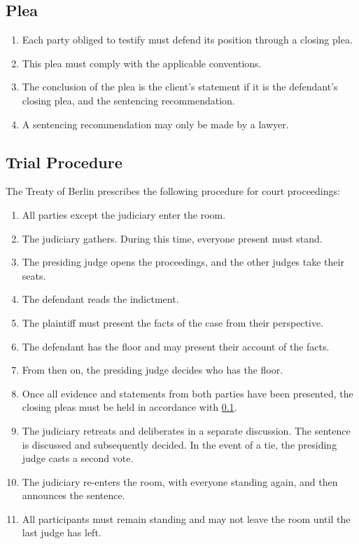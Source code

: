 \documentclass{article}
\begin{document}
\subsection{Plea}\label{pleed}
\begin{enumerate}[(1)]
    \item Each party obliged to testify must defend its position through a closing plea.
    \item This plea must comply with the applicable conventions.
    \item The conclusion of the plea is the client's statement if it is the defendant's closing plea, and the sentencing recommendation.
    \item A sentencing recommendation may only be made by a lawyer.
\end{enumerate}

\subsection{Trial Procedure}\label{verlauf}
The Treaty of Berlin prescribes the following procedure for court proceedings:
\begin{enumerate}[1.]
    \item All parties except the judiciary enter the room.
    \item The judiciary gathers. During this time, everyone present must stand.
    \item The presiding judge opens the proceedings, and the other judges take their seats.
    \item The defendant reads the indictment.
    \item The plaintiff must present the facts of the case from their perspective.
    \item The defendant has the floor and may present their account of the facts.
    \item From then on, the presiding judge decides who has the floor.
    \item Once all evidence and statements from both parties have been presented, the closing pleas must be held in accordance with \ref{pleed}.
    \item The judiciary retreats and deliberates in a separate discussion. The sentence is discussed and subsequently decided. In the event of a tie, the presiding judge casts a second vote.
    \item The judiciary re-enters the room, with everyone standing again, and then announces the sentence.
    \item All participants must remain standing and may not leave the room until the last judge has left.
\end{enumerate}
\end{document}

